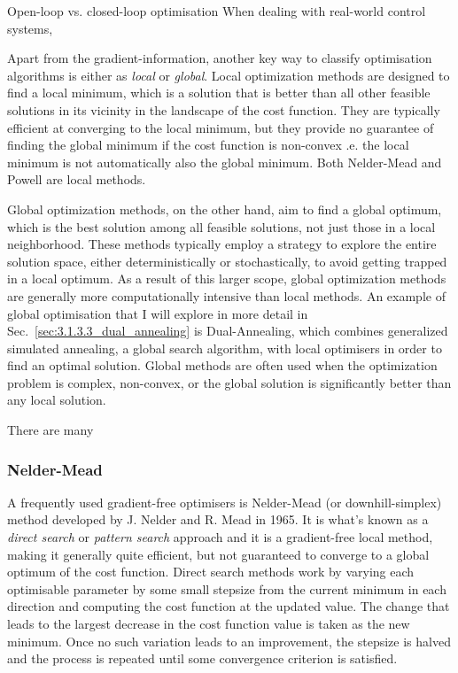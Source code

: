 \begin{mycolorbox}{{Open-loop vs. closed-loop optimisation}}
    When dealing with real-world control systems, 
\end{mycolorbox}

Apart from the gradient-information, another key way to classify optimisation algorithms is either as \emph{local} or \emph{global}. Local optimization methods are designed to find a local minimum, which is a solution that is better than all other feasible solutions in its vicinity in the landscape of the cost function. They are typically efficient at converging to the local minimum, but they provide no guarantee of finding the global minimum if the cost function is non-convex \@i.e. the local minimum is not automatically also the global minimum. Both Nelder-Mead and Powell are local methods.

Global optimization methods, on the other hand, aim to find a global optimum, which is the best solution among all feasible solutions, not just those in a local neighborhood. These methods typically employ a strategy to explore the entire solution space, either deterministically or stochastically, to avoid getting trapped in a local optimum. As a result of this larger scope, global optimization methods are generally more computationally intensive than local methods. An example of global optimisation that I will explore in more detail in Sec.~\ref{sec:3.1.3.3_dual_annealing} is Dual-Annealing, which combines generalized simulated annealing\cite{tsallis_generalized_1996}, a global search algorithm, with local optimisers in order to find an optimal solution. Global methods are often used when the optimization problem is complex, non-convex, or the global solution is significantly better than any local solution.

There are many

\subsubsection{Nelder-Mead}\label{sec:3.1.3.1_Nelder_Mead}

A frequently used gradient-free optimisers is Nelder-Mead (or downhill-simplex) method \cite{nelder_simplex_1965} developed by J. Nelder and R. Mead in 1965. It is what's known as a \emph{direct search} or \emph{pattern search} approach and it is a gradient-free local method, making it generally quite efficient, but not guaranteed to converge to a global optimum of the cost function. Direct search methods work by varying each optimisable parameter by some small stepsize from the current minimum in each direction and computing the cost function at the updated value. The change that leads to the largest decrease in the cost function value is taken as the new minimum. Once no such variation leads to an improvement, the stepsize is halved and the process is repeated until some convergence criterion is satisfied.


